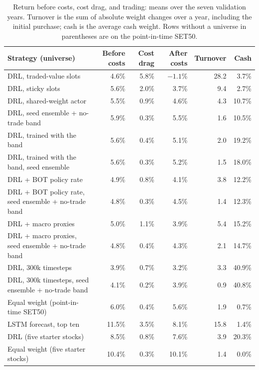 \begin{table}[H]
\centering
\small
\caption{Return before costs, cost drag, and trading: means over the seven validation years. Turnover is the sum of absolute weight changes over a year, including the initial purchase; cash is the average cash weight. Rows without a universe in parentheses are on the point-in-time SET50.}
\label{tab:pit-costs}
\begin{tabularx}{\textwidth}{@{}Yrrrrr@{}}
\toprule
Strategy (universe) & Before costs & Cost drag & After costs & Turnover & Cash \\
\midrule
DRL, traded-value slots & 4.6\% & 5.8\% & $-1.1\%$ & 28.2 & 3.7\% \\
DRL, sticky slots & 5.6\% & 2.0\% & 3.7\% & 9.4 & 2.7\% \\
DRL, shared-weight actor & 5.5\% & 0.9\% & 4.6\% & 4.3 & 10.7\% \\
DRL, seed ensemble + no-trade band & 5.9\% & 0.3\% & 5.5\% & 1.6 & 10.5\% \\
DRL, trained with the band & 5.6\% & 0.4\% & 5.1\% & 2.0 & 19.2\% \\
DRL, trained with the band, seed ensemble & 5.6\% & 0.3\% & 5.2\% & 1.5 & 18.0\% \\
DRL + BOT policy rate & 4.9\% & 0.8\% & 4.1\% & 3.8 & 12.2\% \\
DRL + BOT policy rate, seed ensemble + no-trade band & 4.8\% & 0.3\% & 4.5\% & 1.4 & 12.3\% \\
DRL + macro proxies & 5.0\% & 1.1\% & 3.9\% & 5.4 & 15.2\% \\
DRL + macro proxies, seed ensemble + no-trade band & 4.8\% & 0.4\% & 4.3\% & 2.1 & 14.7\% \\
DRL, 300k timesteps & 3.9\% & 0.7\% & 3.2\% & 3.3 & 40.9\% \\
DRL, 300k timesteps, seed ensemble + no-trade band & 4.1\% & 0.2\% & 3.9\% & 0.9 & 40.8\% \\
Equal weight (point-in-time SET50) & 6.0\% & 0.4\% & 5.6\% & 1.9 & 0.7\% \\
LSTM forecast, top ten & 11.5\% & 3.5\% & 8.1\% & 15.8 & 1.4\% \\
DRL (five starter stocks) & 8.5\% & 0.8\% & 7.6\% & 3.9 & 20.3\% \\
Equal weight (five starter stocks) & 10.4\% & 0.3\% & 10.1\% & 1.4 & 0.0\% \\
\bottomrule
\end{tabularx}
\end{table}

